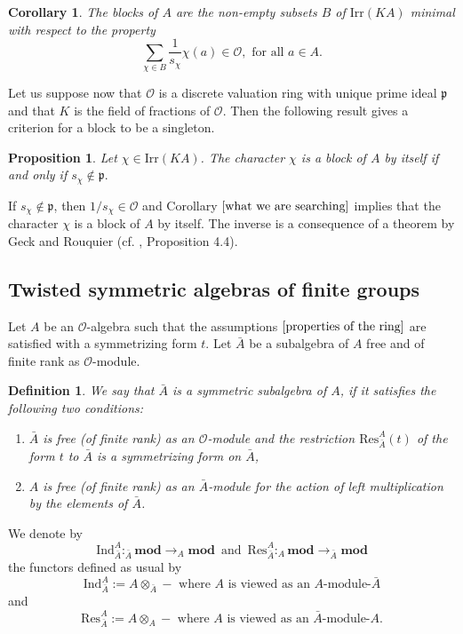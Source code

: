 \documentclass[10pt,a4paper,titlepage]{article}
\newtheorem{definition}[theorem]{Definition}
\newtheorem{corollary}[theorem]{Corollary}
\newtheorem{proposition}[theorem]{Proposition}
\begin{document}
\begin{corollary}\label{what we are searching}
The blocks of $A$ are the non-empty subsets $B$ of
$\mathrm{Irr}(KA)$ minimal with respect to the property
$$\sum_{\chi \in B}\frac{1}{s_\chi}\chi(a) \in \mathcal{O}, \textrm{ for all } a \in A.$$
\end{corollary}

Let us suppose now that $\mathcal{O}$ is a discrete valuation ring with unique prime ideal $\mathfrak{p}$ and that $K$ is the field of fractions of $\mathcal{O}$. Then the following result gives a criterion for a block to be a singleton.

\begin{proposition}\label{Malle-Rouquier}
Let $\chi \in \mathrm{Irr}(KA)$. The character $\chi$ is a block of $A$ by itself if
and only if $s_\chi \notin \mathfrak{p}.$
\end{proposition}
\begin{apod}{If $s_\chi \notin \mathfrak{p}$, then $1/s_\chi \in \mathcal{O}$ and
Corollary $\ref{what we are searching}$ implies that the character $\chi$ is a block of $A$ by itself. The inverse is a consequence of a theorem by Geck and Rouquier (cf. \cite{GeRo}, Proposition 4.4).}
\end{apod}

\subsection {Twisted symmetric algebras of finite groups}

Let $A$ be an $\mathcal{O}$-algebra such that the assumptions
$\ref{properties of the ring}$ are satisfied with a symmetrizing
form $t$. Let $\bar{A}$ be a subalgebra of $A$ free and of finite
rank as $\mathcal{O}$-module.

\begin{definition}\label{symmetric subalgebra}
We say that $\bar{A}$ is
a symmetric subalgebra of $A$, if it satisfies the following two
conditions:
\begin{enumerate}[(1)]
  \item $\bar{A}$ is free (of finite rank) as an $\mathcal{O}$-module and the
  restriction $\mathrm{Res}_{\bar{A}}^A(t)$ of the form $t$ to $\bar{A}$ is a symmetrizing form
  on $\bar{A}$,
  \item $A$ is free (of finite rank) as an $\bar{A}$-module for the action
  of left multiplication by the elements of $\bar{A}$.
\end{enumerate}
\end{definition}
We denote by
$$\mathrm{Ind}_{\bar{A}}^A: _{\bar{A}}\mathrm{\textbf{mod}} \rightarrow _A\mathrm{\textbf{mod}}
\,\textrm{ and }\, \mathrm{Res}_{\bar{A}}^A: _A\mathrm{\textbf{mod}}
\rightarrow _{\bar{A}}\mathrm{\textbf{mod}} $$ the functors defined
as usual by
$$\mathrm{Ind}_{\bar{A}}^A:=A \otimes_{\bar{A}}- \textrm{ where $A$ is viewed as an $A$-module-$\bar{A}$}$$
and
$$\mathrm{Res}_{\bar{A}}^A:=A \otimes_A - \textrm{ where $A$ is viewed as an $\bar{A}$-module-$A$.}$$ $ $
\end{document}
